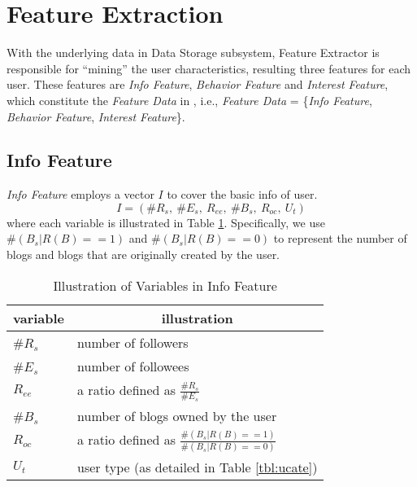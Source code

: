

\section{Feature Extraction}
\label{sec:fe}

With the underlying data in Data Storage subsystem, Feature Extractor is responsible for ``mining'' the user characteristics, resulting three features for each user.
These features are \textit{Info Feature}, \textit{Behavior Feature} and \textit{Interest Feature}, which constitute the \textit{Feature Data} in \sys{}, i.e., \textit{Feature Data} = \{\textit{Info Feature}, \textit{Behavior Feature}, \textit{Interest Feature}\}.

\subsection{Info Feature}

\textit{Info Feature} employs a vector $I$ to cover the basic info of user.
\begin{equation}
\label{eq:info}
	I = (\#R_s,\ \#E_s,\ R_{ee},\ \#B_s,\ R_{oc},\ U_t)
\end{equation}
where each variable is illustrated in Table \ref{tbl:fe-info}.
Specifically, we use $\#(B_s | R(B)==1)$ and $\#(B_s | R(B)==0)$ to represent the number of \retd{} blogs and blogs that are originally created by the user.

\begin{table}[!htb]
\centering
\begin{small}
\caption{Illustration of Variables in Info Feature}
\vspace{0.3cm}
\label{tbl:fe-info}
\begin{tabular}{ll}
\toprule
\multicolumn{1}{c}{\textbf{variable}} & \multicolumn{1}{c}{\textbf{illustration}}	\\	\midrule \midrule
\#$R_s$				& number of followers				\\	\midrule
\#$E_s$				& number of followees				\\	\midrule
\multirow{2}{*}{$R_{ee}$}      & \multirow{2}{*}{a ratio defined as $\frac{\#R_s}{\#E_s}$}	\\
 						&                       									\\	\midrule
\#$B_s$				& number of blogs owned by the user				\\	\midrule
\multirow{2}{*}{$R_{oc}$}      & \multirow{2}{*}{a ratio defined as $\frac{\#(B_s | R(B)==1)}{\#(B_s | R(B)==0)}$}	\\
 						&                       									\\	\midrule
$U_t$					& user type (as detailed in Table \ref{tbl:ucate})			\\ \bottomrule
\end{tabular}
\end{small}
\end{table}


